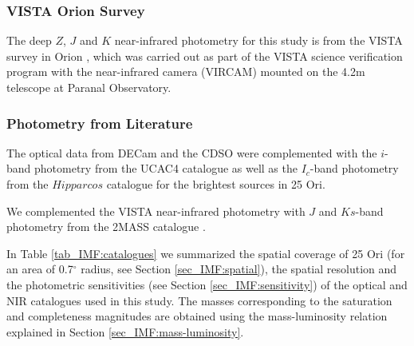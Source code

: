 \documentclass[12pt]{article}
\newcounter{subsubsubsection}[subsubsection]
\begin{document}
\subsubsection{VISTA Orion Survey}
\label{sec_IMF:VISTA}
The deep $Z$, $J$ and $K$ near-infrared photometry for this study is from the VISTA survey in Orion \citep{Petr-Gotzens2011}, which was carried out as part of the VISTA science verification program \citep{Arnaboldi2010} with the near-infrared camera (VIRCAM) mounted on the 4.2m telescope at Paranal Observatory.

\subsubsection{Photometry from Literature}
\label{sec:catalogues}
The optical data from DECam and the CDSO were complemented with the $i$-band photometry from the UCAC4 catalogue \citep{Zacharias2013} as well as the $I_c$-band photometry from the $Hipparcos$ catalogue \citep{Perryman1997} for the brightest sources in 25 Ori.

We complemented the VISTA near-infrared photometry with $J$ and $Ks$-band photometry from the 2MASS catalogue \citep{Skrutskie2006}.

In Table \ref{tab_IMF:catalogues} we summarized the spatial coverage of 25 Ori (for an area of 0.7$^\circ$ radius, see Section \ref{sec_IMF:spatial}), the spatial resolution and the photometric sensitivities (see Section \ref{sec_IMF:sensitivity}) of the optical and NIR catalogues used in this study. The masses corresponding to the saturation and completeness magnitudes are obtained using the mass-luminosity relation explained in Section \ref{sec_IMF:mass-luminosity}.
\end{document}
